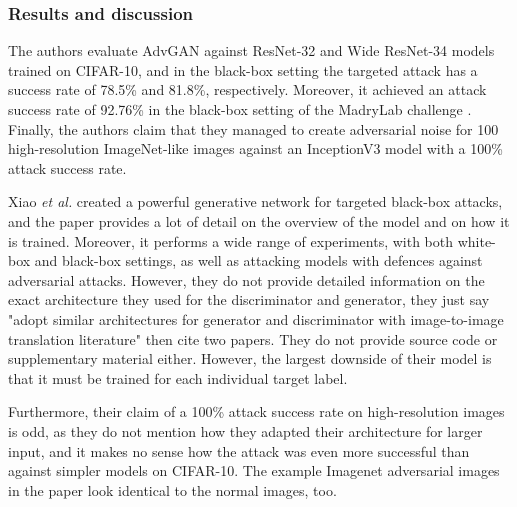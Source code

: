 \subsubsection{Results and discussion}

The authors evaluate AdvGAN against ResNet-32 and Wide ResNet-34 \cite{resnet} models trained on CIFAR-10, and in the black-box setting the targeted attack has a success rate of 78.5\% and 81.8\%, respectively. Moreover, it achieved an attack success rate of 92.76\% in the black-box setting of the MadryLab challenge \cite{madrylab}. Finally, the authors claim that they managed to create adversarial noise for 100 high-resolution ImageNet-like images against an InceptionV3 model \cite{inceptionv3} with a 100\% attack success rate.

Xiao \textit{et al.} created a powerful generative network for targeted black-box attacks, and the paper provides a lot of detail on the overview of the model and on how it is trained. Moreover, it performs a wide range of experiments, with both white-box and black-box settings, as well as attacking models with defences against adversarial attacks. However, they do not provide detailed information on the exact architecture they used for the discriminator and generator, they just say "adopt similar architectures for generator and discriminator with image-to-image translation literature" then cite two papers. They do not provide source code or supplementary material either. However, the largest downside of their model is that it must be trained for each individual target label.

Furthermore, their claim of a 100\% attack success rate on high-resolution images is odd, as they do not mention how they adapted their architecture for larger input, and it makes no sense how the attack was even more successful than against simpler models on CIFAR-10. The example Imagenet adversarial images in the paper look identical to the normal images, too.
